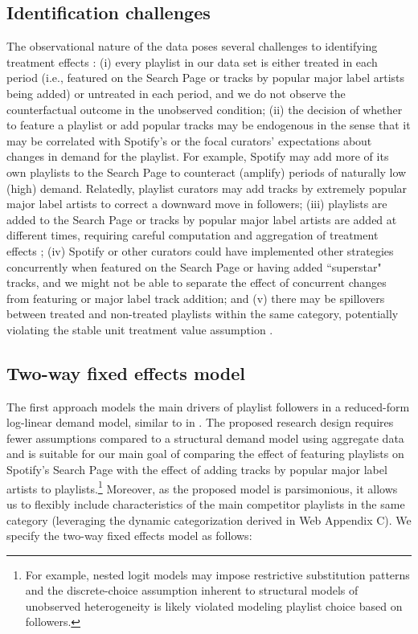 \documentclass[12pt, a4paper, leqno]{article}
\begin{document}
\subsection{Identification challenges}
\label{challenges_identification}

The observational nature of the data poses several challenges to identifying treatment effects \citep[e.g.,][]{berman2022value}: (i) every playlist in our data set is either treated in each period (i.e., featured on the Search Page or tracks by popular major label artists being added) or untreated in each period, and we do not observe the counterfactual outcome in the unobserved condition; (ii) the decision of whether to feature a playlist or add popular tracks may be endogenous in the sense that it may be correlated with Spotify's or the focal curators' expectations about changes in demand for the playlist. For example, Spotify may add more of its own playlists to the Search Page to
counteract (amplify) periods of naturally low (high) demand. Relatedly, playlist curators may add tracks by extremely popular major label artists to correct a downward move in followers; (iii) playlists are added to the Search Page or tracks by popular major label artists are added at different times, requiring careful computation and aggregation of treatment effects \citep[e.g., ][]{baker2022much}; 
(iv) Spotify or other curators could have implemented other strategies concurrently when featured on the Search Page or having added ``superstar" tracks, and we might not be able to separate the effect of concurrent changes from featuring or major label track addition; and (v) there may be spillovers between treated and non-treated playlists within the same category, potentially violating the stable unit treatment value assumption \citep[e.g.,][]{goldfarb2022conducting}.  

\subsection{Two-way fixed effects model} 

\label{two_way_fe}

The first approach models the main drivers of playlist followers in a reduced-form log-linear demand model, similar to in \cite{shapiro_hitsch_tuchman_2021}. The proposed research design requires fewer assumptions compared to a structural demand model using aggregate data \citep[e.g.,][]{Berry1994} and is suitable for our main goal of comparing the effect of featuring playlists on Spotify's Search Page with the effect of adding tracks by popular major label artists to playlists.\footnote{For example, nested logit models may impose restrictive substitution patterns \citep[e.g.,][]{Berry1995,bresnahan_1996_RAND} and the discrete-choice assumption inherent to structural models of unobserved heterogeneity \citep[][]{Berry1995} is likely violated modeling playlist choice based on followers.} 
Moreover, as the proposed model is parsimonious, it allows us to flexibly include characteristics of the main competitor playlists in the same category (leveraging the dynamic categorization derived in Web Appendix C). We specify the two-way fixed effects model as follows:
\end{document}
